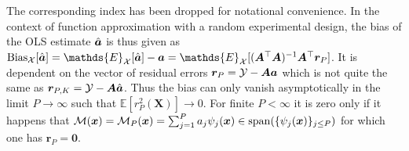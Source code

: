 The corresponding index has been dropped for notational convenience.
In the context of function approximation with a random experimental design, the bias of the OLS estimate \(\hat{\bm{a}}\) is thus given as
\(\mathrm{Bias}_\mathcal{X}[\hat{\bm{\coeffM}}] = \mathds{E}_\mathcal{X}[\hat{\bm{\coeffM}}] - \bm{\coeffM} = \mathds{E}_\mathcal{X}[(\bm{A}^\top \bm{A})^{-1} \bm{A}^\top \bm{r}_P]\).
It is dependent on the vector of residual errors \(\bm{r}_P = \mathcal{Y} - \bm{A} \bm{a}\) which is not quite the same as \(\bm{r}_{P,K} = \mathcal{Y} - \bm{A} \hat{\bm{a}}\).
Thus the bias can only vanish asymptotically in the limit \(P \to \infty\) such that \(\mathds{E}[r_P^2(\bm{X})] \to 0\).
For finite \(P < \infty\) it is zero only if it happens that
\(\mathcal{M}(\bm{x}) = \mathcal{M}_P(\bm{x}) = \sum_{j=1}^P a_{j} \psi_{j}(\bm{x}) \in \mathrm{span}(\{\psi_{j}(\bm{x})\}_{j \leq P})\) for which one has \(\bm{r}_P = \bm{0}\).

